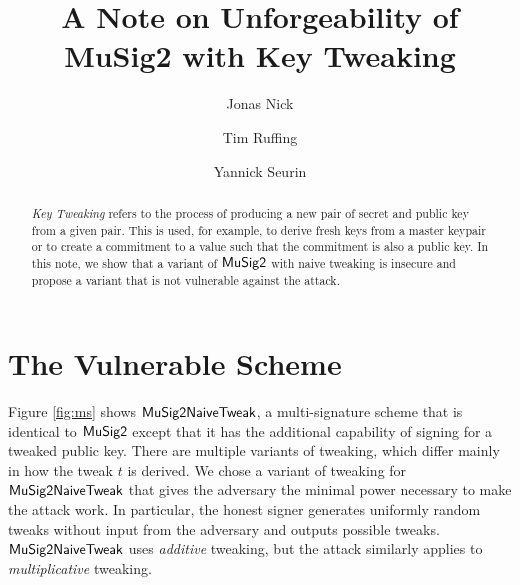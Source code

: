 \documentclass[a4paper,orivec,oribibl,english]{llncs}
\begin{document}
\author{
  Jonas Nick \and
  Tim Ruffing \and
  Yannick Seurin
 }

\title{
    A Note on Unforgeability of MuSig2 with Key Tweaking
}
\maketitle

\begin{abstract}
\emph{Key Tweaking} refers to the process of producing a new pair of secret and public key from a given pair.
This is used, for example, to derive fresh keys from a master keypair or to create a commitment to a value such that the commitment is also a public key.
In this note, we show that a variant of $\mathsf{MuSig2}$ with naive tweaking is insecure and propose a variant that is not vulnerable against the attack.
\end{abstract}

\section{The Vulnerable Scheme}
Figure \ref{fig:ms} shows $\mathsf{MuSig2NaiveTweak}$, a multi-signature scheme that is identical to $\mathsf{MuSig2}$ except that it has the additional capability of signing for a tweaked public key.
There are multiple variants of tweaking, which differ mainly in how the tweak $t$ is derived.
We chose a variant of tweaking for $\mathsf{MuSig2NaiveTweak}$ that gives the adversary the minimal power necessary to make the attack work.
In particular, the honest signer generates uniformly random tweaks without input from the adversary and outputs possible tweaks.
$\mathsf{MuSig2NaiveTweak}$ uses \emph{additive} tweaking, but the attack similarly applies to \emph{multiplicative} tweaking.
\end{document}
